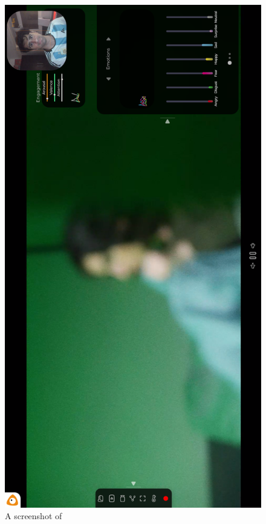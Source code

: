 \documentclass[12pt, a4paper]{article}
\begin{document}
\begin{appendices}
\begin{figure}[H]
    \centering
    \includegraphics[scale=0.43]{images/morphcast.png}
    \caption{A screenshot of \cite{morphcast}}
    \label{fig:essmorphcast}
\end{figure}


\end{appendices}
\end{document}
